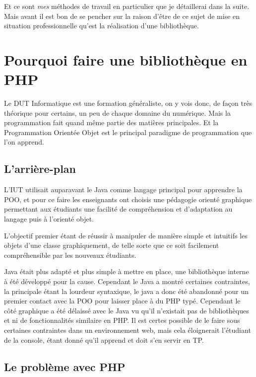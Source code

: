 \documentclass[11pt,a4paper,krantz2,11pt,oneside]{krantz}
\begin{document}
Et ce sont \emph{mes} méthodes de travail en particulier que je détaillerai dans la suite. Mais avant il est bon de se pencher sur la raison d'être de ce sujet de mise en situation professionnelle qu'est la réalisation d'une bibliothèque.

\hypertarget{pourquoi-faire-une-bibliothuxe8que-en-php}{%
\section{Pourquoi faire une bibliothèque en PHP}\label{pourquoi-faire-une-bibliothuxe8que-en-php}}

Le DUT Informatique est une formation généraliste, on y vois donc, de façon très théorique pour certains, un peu de chaque domaine du numérique. Mais la programmation fait quand même partie des matières principales. Et la Programmation Orientée Objet est le principal paradigme de programmation que l'on apprend.

\hypertarget{larriuxe8re-plan}{%
\subsection{L'arrière-plan}\label{larriuxe8re-plan}}

L'IUT utilisait auparavant le Java comme langage principal pour apprendre la POO, et pour ce faire les enseignants ont choisis une pédagogie orienté graphique permettant aux étudiants une facilité de compréhension et d'adaptation au langage puis à l'orienté objet.

L'objectif premier étant de réussir à manipuler de manière simple et intuitifs les objets d'une classe graphiquement, de telle sorte que ce soit facilement compréhensible par les nouveaux étudiants.

Java était plus adapté et plus simple à mettre en place, une bibliothèque interne à été développé pour la cause. Cependant le Java a montré certaines contraintes, la principale étant la lourdeur syntaxique, le java a donc été abandonné pour un premier contact avec la POO pour laisser place à du PHP typé. Cependant le côté graphique a été délaissé avec le Java vu qu'il n'existait pas de bibliothèques et ni de fonctionnalités similaire en PHP. Il est certes possible de le faire sous certaines contraintes dans un environnement web, mais cela éloignerait l'étudiant de la console, étant donné qu'il apprend et doit s'en servir en TP.

\hypertarget{le-probluxe8me-avec-php}{%
\subsection{Le problème avec PHP}\label{le-probluxe8me-avec-php}}
\end{document}

